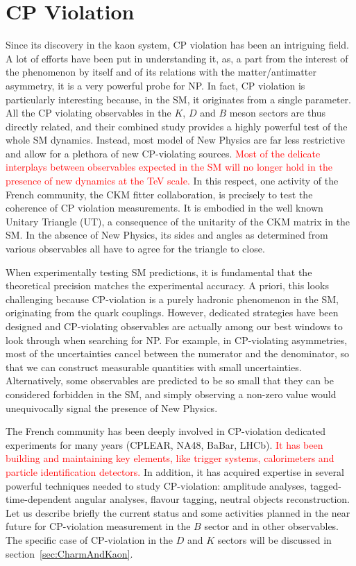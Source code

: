 

\section{CP Violation}
\label{sec:cpv}
Since its discovery in the kaon system, CP violation has been an intriguing field. A lot of efforts have been put in understanding it, as,  a part from the interest of the phenomenon by itself and of its relations with the matter/antimatter asymmetry, it is a very powerful probe for NP.  In fact,  CP violation is particularly interesting because, in the SM, it originates from a single parameter. All the CP violating observables in the $K$, $D$ and $B$ meson sectors are thus directly related, and
their combined study provides a highly powerful test of the whole SM dynamics.
Instead, most model of New Physics are far less restrictive and allow for a
plethora of new CP-violating sources. 
\textcolor{red}{Most of the delicate interplays between observables
expected in the SM will no longer hold in the presence of new dynamics at the TeV scale.}  
In this respect, one
activity of the French community, the CKM fitter collaboration, is precisely
to test the coherence of CP violation measurements. It is embodied in the well
known Unitary Triangle (UT), a consequence of the unitarity of the CKM matrix
in the SM. In the absence of New Physics, its sides and angles as determined
from various observables all have to agree for the triangle to close.


When experimentally testing SM predictions, it is fundamental that the
theoretical precision matches the experimental accuracy. A priori, this looks
challenging because CP-violation is a purely hadronic phenomenon in the SM,
originating from the quark couplings. However, dedicated strategies have been
designed and CP-violating observables are actually among our best windows to look through when searching for  NP. For
example, in CP-violating asymmetries, most of the uncertainties cancel between
the numerator and the denominator, so that we can construct measurable
quantities with small uncertainties. Alternatively, some observables are
predicted to be so small that they can be considered forbidden in the SM, and
simply observing a non-zero value would unequivocally signal the presence of
New Physics.

The French community has been deeply involved in CP-violation dedicated experiments for
many years (CPLEAR, NA48, BaBar, LHCb). \textcolor{red}{It has been building and maintaining key
elements, like trigger systems, calorimeters and particle identification detectors. } In addition, it has acquired expertise in
several powerful techniques needed to study CP-violation: amplitude analyses, tagged-time-dependent
angular analyses, flavour tagging, neutral objects reconstruction.  Let us describe
briefly the current status and some activities planned in the near future for CP-violation measurement in the $B$ sector and in other observables. The specific case of CP-violation in the $D$ and $K$ sectors will be discussed in section~\ref{sec:CharmAndKaon}. 

